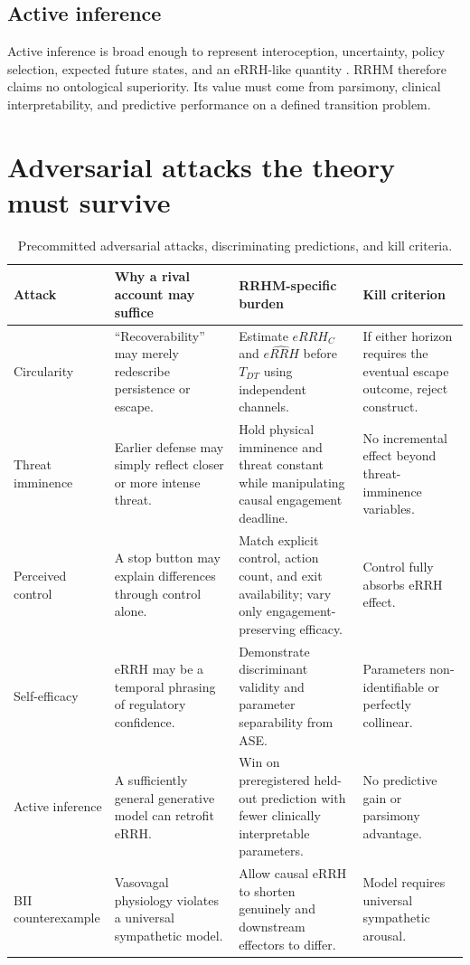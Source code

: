 \documentclass[9pt,twocolumn]{article}
\begin{document}
\subsection{Active inference}
Active inference is broad enough to represent interoception, uncertainty, policy selection, expected future states, and an eRRH-like quantity \cite{paulus2019}. RRHM therefore claims no ontological superiority. Its value must come from parsimony, clinical interpretability, and predictive performance on a defined transition problem.

\section{Adversarial attacks the theory must survive}
\begin{table}[t]
\centering
\caption{Precommitted adversarial attacks, discriminating predictions, and kill criteria.}
\small
\begin{tabularx}{\textwidth}{p{}X X p{}}
\toprule
\textbf{Attack} & \textbf{Why a rival account may suffice} & \textbf{RRHM-specific burden} & \textbf{Kill criterion} \\
\midrule
Circularity & ``Recoverability'' may merely redescribe persistence or escape. & Estimate $eRRH_C$ and $\widehat{eRRH}$ before $T_{DT}$ using independent channels. & If either horizon requires the eventual escape outcome, reject construct. \\
Threat imminence & Earlier defense may simply reflect closer or more intense threat. & Hold physical imminence and threat constant while manipulating causal engagement deadline. & No incremental effect beyond threat-imminence variables. \\
Perceived control & A stop button may explain differences through control alone. & Match explicit control, action count, and exit availability; vary only engagement-preserving efficacy. & Control fully absorbs eRRH effect. \\
Self-efficacy & eRRH may be a temporal phrasing of regulatory confidence. & Demonstrate discriminant validity and parameter separability from ASE. & Parameters non-identifiable or perfectly collinear. \\
Active inference & A sufficiently general generative model can retrofit eRRH. & Win on preregistered held-out prediction with fewer clinically interpretable parameters. & No predictive gain or parsimony advantage. \\
BII counterexample & Vasovagal physiology violates a universal sympathetic model. & Allow causal eRRH to shorten genuinely and downstream effectors to differ. & Model requires universal sympathetic arousal. \\

\end{tabularx}
\end{table}
\end{document}
